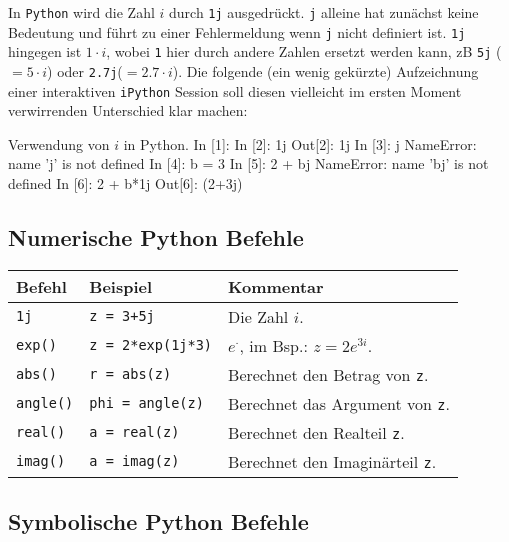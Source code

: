 In \texttt{Python} wird die Zahl $i$ durch \texttt{1j} ausgedrückt. \texttt{j} alleine hat zunächst keine Bedeutung und führt zu einer Fehlermeldung wenn \texttt{j} nicht definiert ist. \texttt{1j} hingegen ist $1\cdot i$, wobei \texttt{1} hier durch andere Zahlen ersetzt werden kann, zB \texttt{5j} ($=5\cdot i$) oder \texttt{2.7j}($=2.7 \cdot i$). Die folgende (ein wenig gekürzte) Aufzeichnung einer interaktiven \texttt{iPython} Session soll diesen vielleicht im ersten Moment verwirrenden Unterschied klar machen:

\begin{python}{Verwendung von $i$ in Python.}
In [1]: %
In [2]: 1j
Out[2]: 1j
In [3]: j
NameError: name 'j' is not defined
In [4]: b = 3
In [5]: 2 + bj
NameError: name 'bj' is not defined
In [6]: 2 + b*1j
Out[6]: (2+3j)
\end{python}


\subsection*{Numerische Python Befehle}
\begin{table}[H]
    \centering
    \begin{tabular}{|p{3cm}|p{6cm}|p{6cm}|}
        \hline
    \textbf{Befehl} & \textbf{Beispiel} & \textbf{Kommentar} \\ \hline
    
    \texttt{1j} & \texttt{z = 3+5j} & Die Zahl $i$. \\ \hline
    \texttt{exp()} & \texttt{z = 2*exp(1j*3)} & $e^{\cdot}$, im Bsp.: $z = 2e^{3i}$. \\ \hline
    \texttt{abs()} & \texttt{r = abs(z)} & Berechnet den Betrag von \texttt{z}. \\ \hline
    \texttt{angle()} & \texttt{phi = angle(z)} & Berechnet das Argument von \texttt{z}. \\ \hline
    \texttt{real()} & \texttt{a = real(z)} & Berechnet den Realteil \texttt{z}. \\ \hline
    \texttt{imag()} & \texttt{a = imag(z)} & Berechnet den Imaginärteil \texttt{z}. \\ \hline

    \end{tabular}
\end{table}

\subsection*{Symbolische Python Befehle}

